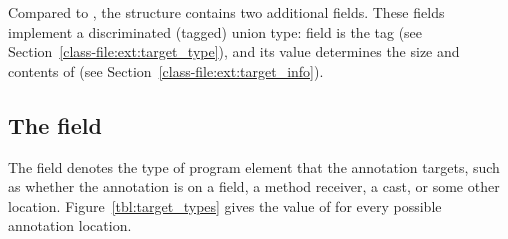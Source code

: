 \documentclass[10pt]{article}
\begin{document}
Compared to ,
the \extendedannotation structure contains two additional fields.
These fields implement a discriminated (tagged) union type:
field  is the tag (see
Section~\ref{class-file:ext:target_type}), and its value determines the
size and
contents of  (see Section~\ref{class-file:ext:target_info}).


\subsection{The  field\label{class-file:ext:target_type}\label{target_type}}

The  field denotes the type of program element that
the annotation targets, such as whether the annotation is on a field, a
method receiver, a cast, or some other location.
Figure~\ref{tbl:target_types} gives the value of  for
every possible annotation location.


\def\unused{\ensuremath{*}}
\ifhevea
  \def\rlapunused{\relax}
\else
  \def\rlunused{\rlap{\unused}}
\fi
\end{document}
